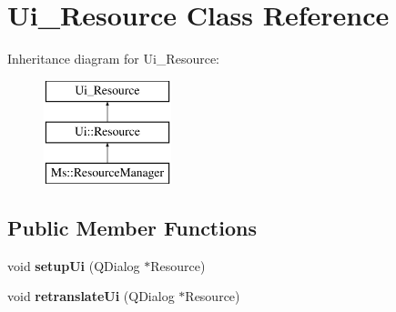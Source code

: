 \hypertarget{class_ui___resource}{}\section{Ui\+\_\+\+Resource Class Reference}
\label{class_ui___resource}
Inheritance diagram for Ui\+\_\+\+Resource\+:\begin{figure}[H]
\begin{center}
\leavevmode
\includegraphics[height=3.000000cm]{class_ui___resource}
\end{center}
\end{figure}
\subsection*{Public Member Functions}
\begin{DoxyCompactItemize}
\item 
\mbox{\label{class_ui___resource_a92b1fa9412fffb6871fda6fb52c99c51}} 
void {\bfseries setup\+Ui} (Q\+Dialog $\ast$Resource)
\item 
\mbox{\label{class_ui___resource_abf6cc0049b9320d09de00fd68016ba76}} 
void {\bfseries retranslate\+Ui} (Q\+Dialog $\ast$Resource)
\end{DoxyCompactItemize}
